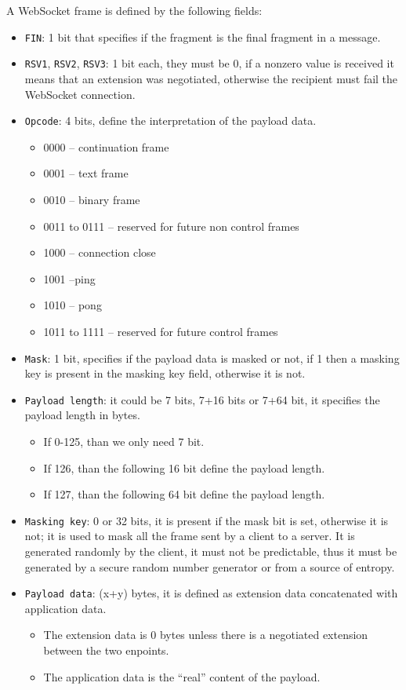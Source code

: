 A WebSocket frame is defined by the following fields:
\begin{itemize}
	\item \texttt{FIN}: 1 bit that specifies if the fragment is the final fragment in a message.
	\item \texttt{RSV1}, \texttt{RSV2}, \texttt{RSV3}: 1 bit each, they must be 0, if a nonzero value is received it means that an extension was negotiated, otherwise the recipient must fail the WebSocket connection.
	\item \texttt{Opcode}: 4 bits, define the interpretation of the payload data.
	\begin{itemize}
		\item 0000 – continuation frame
		\item 0001 – text frame
		\item 0010 – binary frame
		\item 0011 to 0111 – reserved for future non control frames
		\item 1000 – connection close
		\item 1001 –ping
		\item 1010 – pong
		\item 1011 to 1111 – reserved for future control frames
	\end{itemize}
	\item \texttt{Mask}: 1 bit, specifies if the payload data is masked or not, if 1 then a masking key is present in the masking key field, otherwise it is not.
	\item \texttt{Payload length}: it could be 7 bits, 7+16 bits or 7+64 bit, it specifies the payload length in bytes.
	\begin{itemize}
		\item If 0-125, than we only need 7 bit.
		\item If 126, than the following 16 bit define the payload length.
		\item If 127, than the following 64 bit define the payload length.
	\end{itemize}
	\item \texttt{Masking key}: 0 or 32 bits, it is present if the mask bit is set, otherwise it is not; it is used to mask all the frame sent by a client to a server.
	It is generated randomly by the client, it must not be predictable, thus it must be generated by a secure random number generator or from a source of entropy.
	\item \texttt{Payload data}: (x+y) bytes, it is defined as extension data concatenated with application data.
	\begin{itemize}
		\item The extension data is 0 bytes unless there is a negotiated extension between the two enpoints.
		\item The application data is the “real” content of the payload.
	\end{itemize}
\end{itemize}

